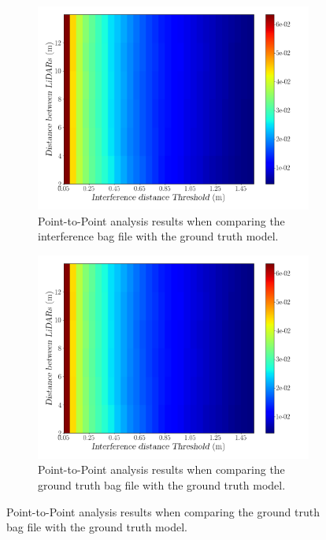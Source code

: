 \begin{figure}[!ht]
\centering
\begin{subfigure}[c]{0.45\textwidth}
	\includegraphics[width=\textwidth]{img/lidar-interference/LOS/interference_distance_color_mesh.png}
	\caption{Point-to-Point analysis results when comparing the interference bag file with the ground truth model.}
	\label{fig:los:interference-color-mesh}
\end{subfigure}
\qquad
\begin{subfigure}[c]{0.45\textwidth}
	\includegraphics[width=\textwidth]{img/lidar-interference/LOS/ground_truth_distance_color_mesh.png}
	\caption{Point-to-Point analysis results when comparing the ground truth bag file with the ground truth model.}

\end{subfigure}
\end{figure}
